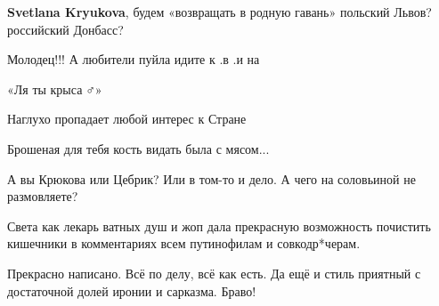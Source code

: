 \begin{itemize}
 
\textbf{Svetlana Kryukova}, будем «возвращать в родную гавань» польский Львов? российский Донбасс?

 
Молодец!!! А любители пуйла идите к .в .и на

 
«Ля ты крыса🤦♂️»

Наглухо пропадает любой интерес к Стране

Брошеная для тебя кость видать была с мясом...

 
А вы Крюкова или Цебрик? Или в том-то и дело. А чего на соловьиной не размовляете?

 
Света как лекарь ватных душ и жоп дала прекрасную возможность почистить кишечники в комментариях всем путинофилам и совкодр*черам.

 
Прекрасно написано. Всё по делу, всё как есть. Да ещё и стиль приятный с достаточной долей иронии и сарказма. Браво!

 

\end{itemize}
